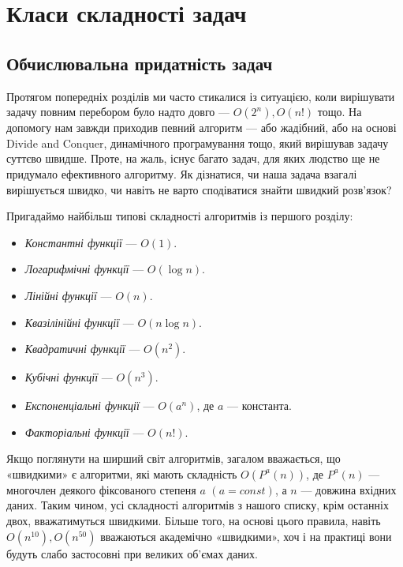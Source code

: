 \documentclass[12pt,a4paper]{report}
\begin{document}
\chapter{Класи складності задач}

\begingroup
\let\clearpage\relax
\tableofcontents
\endgroup



\section{Обчислювальна придатність задач}

Протягом попередніх розділів ми часто стикалися із ситуацією, коли вирішувати задачу повним перебором було надто довго --- \(O(2^n), O(n!)\) тощо. На допомогу нам завжди приходив певний алгоритм --- або жадібний, або на основі Divide and Conquer, динамічного програмування тощо, який вирішував задачу суттєво швидше. Проте, на жаль, існує багато задач, для яких людство ще не придумало ефективного алгоритму. Як дізнатися, чи наша задача взагалі вирішується швидко, чи навіть не варто сподіватися знайти швидкий розв’язок?

Пригадаймо найбільш типові складності алгоритмів із першого розділу:

\begin{itemize}
    \item \emph{Константні функції} --- \(O(1)\).
    \item \emph{Логарифмічні функції} --- \(O(\log{}n)\).
    \item \emph{Лінійні функції} --- \(O(n)\).
    \item \emph{Квазілінійні функції} --- \(O(n\log{}n)\).
    \item \emph{Квадратичні функції} --- \(O(n^2)\).
    \item \emph{Кубічні функції} --- \(O(n^3)\).
    \item \emph{Експоненціальні функції} --- \(O(a^n)\), де \(a\) --- константа.
    \item \emph{Факторіальні функції} --- \(O(n!)\).
\end{itemize}

Якщо поглянути на ширший світ алгоритмів, загалом вважається, що «швидкими» є алгоритми, які мають складність \(O(P ^ a(n))\), де \(P ^ a(n)\) --- многочлен деякого фіксованого степеня \(a\) \((a = const)\), а \(n\) --- довжина вхідних даних. Таким чином, усі складності алгоритмів з нашого списку, крім останніх двох, вважатимуться швидкими. Більше того, на основі цього правила, навіть \(O(n ^ {10}), O(n ^ {50})\) вважаються академічно «швидкими», хоч і на практиці вони будуть слабо застосовні при великих об’ємах даних.
\end{document}
